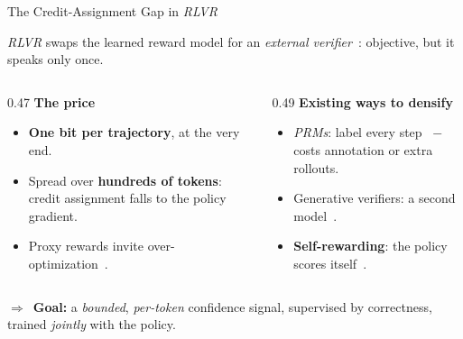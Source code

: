 \documentclass[aspectratio=169,10pt,t]{beamer}
\DeclareRobustCommand{\acit}[1]{\textit{\acs{#1}}}
\DeclareRobustCommand{\acpit}[1]{\textit{\acsp{#1}}}
\DeclareRobustCommand{\acfit}[1]{\textit{\acs{#1}}}
\newcommand{\takeaway}[1]{%
	\vfill
	\setlength{\fboxsep}{4pt}%
	\noindent\colorbox{jkulight}{%
		\begin{minipage}{\dimexpr\textwidth-2\fboxsep\relax}%
			\footnotesize\raggedright\color{jkunavy}%
			\textcolor{jkumagenta}{\textbf{$\Rightarrow$}}~#1%
		\end{minipage}}%
	\vspace{1pt}%
}
\newcommand{\headline}[1]{%
	\setlength{\fboxsep}{4pt}%
	\noindent\colorbox{jkulight}{%
		\begin{minipage}{\dimexpr\textwidth-2\fboxsep\relax}%
			\footnotesize\raggedright\color{jkunavy}#1%
		\end{minipage}}%
	\vspace{0.18cm}%
}
\newcommand{\lead}[1]{{\color{jkunavy}\textbf{#1}}\par\vspace{1pt}}
\newcommand{\hl}[1]{\textcolor{jkumagenta}{\textbf{#1}}}
\newcommand{\nv}[1]{\textcolor{jkunavy}{\textbf{#1}}}
\begin{document}
\begin{frame}{The Credit-Assignment Gap in \acit{RLVR}}
	\headline{\acfit{RLVR} swaps the learned reward model for an \emph{external verifier}~\citep{deepseekmath, r1}: objective, but it speaks only once.}
	\begin{columns}[T, onlytextwidth]
		\begin{column}{0.47\textwidth}
			\lead{The price}
			\begin{itemize}
				\setlength{\itemsep}{4pt}
				\item \hl{One bit per trajectory}, at the very end.
				\item Spread over \hl{hundreds of tokens}: credit assignment falls to the policy gradient.
				\item Proxy rewards invite over-optimization~\citep{rewardoveropt, spuriousrewards}.
			\end{itemize}
		\end{column}
		\begin{column}{0.49\textwidth}
			\lead{Existing ways to densify}
			\begin{itemize}
				\setlength{\itemsep}{4pt}
				\item \acpit{PRM}: label every step~\citep{verifystepbystep, mathshepherd} $-$ costs annotation or extra rollouts.
				\item Generative verifiers: a second model~\citep{genverifiers}.
				\item \nv{Self-rewarding}: the policy scores itself~\citep{selfrewardingllms, confasreward}.
			\end{itemize}
		\end{column}
	\end{columns}
	\takeaway{\textbf{Goal:} a \emph{bounded}, \emph{per-token} confidence signal, supervised by correctness, trained \emph{jointly} with the policy.}
\end{frame}
\end{document}
